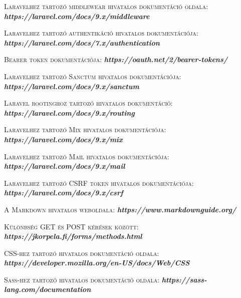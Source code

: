 \documentclass[
]{thesis-ekf}
\theoremstyle{definition}
\theoremstyle{remark}
\begin{document}
\begin{thebibliography}{2}
		\textsc{Laravelhez tartozó middlewear hivatalos dokumentáció oldala:}
		\newline
		\emph{\bf{https://laravel.com/docs/9.x/middleware}}
		
		\textsc{Laravelhez tartozó authentikáció hivatalos dokumentációja:}
		\newline
		\emph{\bf{https://laravel.com/docs/7.x/authentication}}
		
		\textsc{Bearer token dokumentációja:}
		\newline
		\emph{\bf{https://oauth.net/2/bearer-tokens/}}
		
		\textsc{Laravelhez tartozó Sanctum hivatalos dokumentációja:}
		\newline
		\emph{\bf{https://laravel.com/docs/9.x/sanctum}}
		
		\textsc{Laravel rootinghoz tartozó hivatalos dokumentáció:}
		\newline
		\emph{\bf{https://laravel.com/docs/9.x/routing}}
		
		\textsc{Laravelhez tartozó Mix hivatalos dokumentációja:}
		\newline
		\emph{\bf{https://laravel.com/docs/9.x/mix}}
		
		\textsc{Laravelhez tartozó Mail hivatalos dokumentációja:}
		\newline
		\emph{\bf{https://laravel.com/docs/9.x/mail}}
		
		\textsc{Laravelhez tartozó CSRF token hivatalos dokumentációja:}
		\newline
		\emph{\bf{https://laravel.com/docs/9.x/csrf}}
		
		\textsc{A Markdown hivatalos weboldala:}
		\newline
		\emph{\bf{https://www.markdownguide.org/}}
		
		\textsc{Különbség GET és POST kérések között:}
		\newline
		\emph{\bf{https://jkorpela.fi/forms/methods.html}}
		
		\textsc{CSS-hez tartozó hivatalos dokumentáció oldala:}
		\newline
		\emph{\bf{https://developer.mozilla.org/en-US/docs/Web/CSS}}
		
		\textsc{Sass-hez tartozó hivatalos dokumentáció oldala:}
		\newline
		\emph{\bf{https://sass-lang.com/documentation}}
		

\end{thebibliography}
\end{document}
